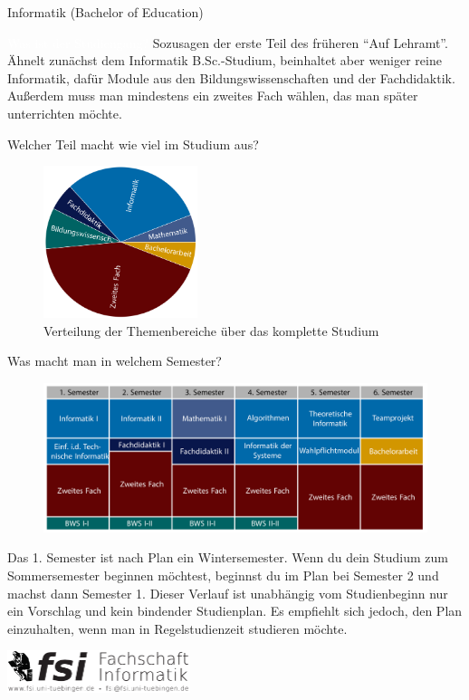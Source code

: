 	\begin{Huge}
			Informatik (Bachelor of Education)
		\end{Huge}
		\begin{exampleblock}{\textcolor{white}{Was ist der Studiengang?}}
			Sozusagen der erste Teil des früheren "`Auf Lehramt"'. Ähnelt zunächst dem Informatik B.Sc.-Studium, beinhaltet aber weniger reine Informatik, dafür Module aus den Bildungswissenschaften und der Fachdidaktik. Außerdem muss man mindestens ein zweites Fach wählen, das man später unterrichten möchte.
		\end{exampleblock}
	
	\begin{block}{Welcher Teil macht wie viel im Studium aus?}
		\begin{figure}[h!]
			\includegraphics[width=0.4\textwidth]{images/lehramt_informatik_piechartonly.pdf}
			\caption{Verteilung der Themenbereiche über das komplette Studium}
		\end{figure}
	\end{block}
	
	\begin{block}{Was macht man in welchem Semester?}
		\begin{figure}[h!]
			\includegraphics[width=\textwidth]{images/lehramt_informatik_Studienplanonly.pdf}
		\end{figure}
		Das 1. Semester ist nach Plan ein Wintersemester. Wenn du dein Studium zum Sommersemester beginnen möchtest, beginnst du im Plan bei Semester 2 und machst dann Semester 1. 
		Dieser Verlauf ist unabhängig vom Studienbeginn nur ein Vorschlag und kein bindender Studienplan. Es empfiehlt sich jedoch, den Plan einzuhalten, wenn man in Regelstudienzeit studieren möchte.
	\end{block}
\vfill
\begin{flushright}
	\includegraphics[width=0.4\textwidth]{images/fsilogo.pdf}
\end{flushright}
